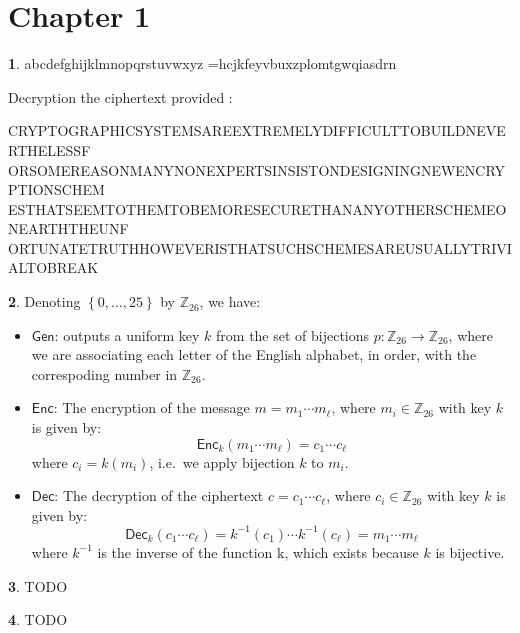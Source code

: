 \documentclass{article}
\theoremstyle{definition}
\newcommand{\bb}[1]{\mathbb{#1}}
\newcommand{\Z}{\bb{Z}}
\newcommand{\set}[1]{\left\{#1\right\}}
\newcommand{\Gen}{\mathsf{Gen}}
\newcommand{\Enc}{\mathsf{Enc}}
\newcommand{\Dec}{\mathsf{Dec}}
\theoremstyle{definition}
\theoremstyle{definition}
\newtheorem{solution-internal}{}[subsection]
\newenvironment{solution}{
  \begin{solution-internal}
}{
  \end{solution-internal}
}
\begin{document}
\section*{Chapter 1}
\setcounter{section}{1}
\setcounter{subsection}{1}

\begin{solution}
  abcdefghijklmnopqrstuvwxyz =\gg hcjkfeyvbuxzplomtgwqiasdrn

Decryption the ciphertext provided :

CRYPTOGRAPHICSYSTEMSAREEXTREMELYDIFFICULTTOBUILDNEVERTHELESSF
ORSOMEREASONMANYNONEXPERTSINSISTONDESIGNINGNEWENCRYPTIONSCHEM
ESTHATSEEMTOTHEMTOBEMORESECURETHANANYOTHERSCHEMEONEARTHTHEUNF
ORTUNATETRUTHHOWEVERISTHATSUCHSCHEMESAREUSUALLYTRIVIALTOBREAK
\end{solution}

\begin{solution}
  Denoting $\set{0, \dots, 25}$ by $\Z_{26}$, we have:
  \begin{itemize}
    \item $\Gen$: outputs a uniform key $k$ from the set of bijections
      $p\colon\Z_{26} \to \Z_{26}$, where we are associating each letter of the
      English alphabet, in order, with the correspoding number in $\Z_{26}$.
    \item $\Enc$: The encryption of the message $m = m_1\cdots m_{\ell}$, where
      $m_i \in \Z_{26}$ with key $k$ is given by:
      \[ \Enc_k(m_1 \cdots m_{\ell}) = c_1 \cdots c_{\ell}\]
      where $c_i = k(m_i)$, i.e.\ we apply bijection $k$ to $m_i$.
    \item $\Dec$: The decryption of the ciphertext $c = c_1 \cdots c_{\ell}$,
      where $c_i \in \Z_{26}$ with key $k$ is given by:
      \[ \Dec_k(c_1 \cdots c_{\ell}) = k^{-1}(c_1) \cdots k^{-1}(c_{\ell}) = m_1 \cdots
      m_{\ell}\]
      where $k^{-1}$ is the inverse of the function k, which exists because $k$
      is bijective.
  \end{itemize}
\end{solution}

\begin{solution}
  TODO
\end{solution}

\begin{solution}
  TODO
\end{solution}
\end{document}

